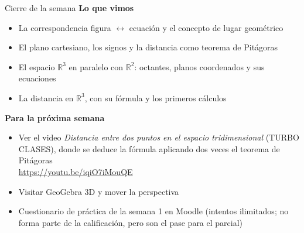 \documentclass[aspectratio=169,10pt]{beamer}
\newcommand{\destaca}[1]{%
  \par\vspace{3pt}\noindent
  \colorbox{turquesaClaro}{%
    \parbox{\dimexpr\linewidth-2\fboxsep\relax}{\vspace{3pt}#1\vspace{3pt}}}%
  \par\vspace{3pt}}
\begin{document}
\begin{frame}{Cierre de la semana}
  \textbf{Lo que vimos}
  {\small
  \begin{itemize}
    \item La correspondencia figura $\leftrightarrow$ ecuación y el
      concepto de lugar geométrico %

    \item El plano cartesiano, los signos y la distancia como teorema
      de Pitágoras %
    \item El espacio $\mathbb{R}^3$ en paralelo con $\mathbb{R}^2$:
      octantes, planos coordenados y sus ecuaciones
    \item La distancia en $\mathbb{R}^3$, con su fórmula y los
      primeros cálculos %
  \end{itemize}}

  \vspace{0.05cm}
  \textbf{Para la próxima semana}
  {\small
  \begin{itemize}
    \item Ver el video \textit{Distancia entre dos puntos en el
      espacio tridimensional} (TURBO CLASES), donde se deduce la
      fórmula aplicando dos veces el teorema de Pitágoras\\
      {\footnotesize\url{https://youtu.be/iqiO7iMouQE}}
    \item %
    Visitar GeoGebra 3D y
      mover la perspectiva
    \item Cuestionario de práctica de la semana 1 en Moodle
      (intentos ilimitados; no forma parte de la calificación, pero son el pase para el parcial)
  \end{itemize}}

%
\end{frame}
\end{document}
